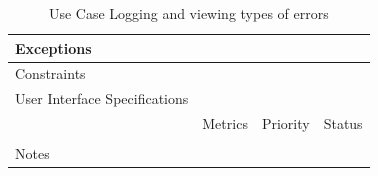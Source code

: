 \begin{table}[H]
\begin{tabularx}{\linewidth}{|l|X|X|X|}
            \hline Exceptions                    & \multicolumn{3}{l|}{}                                                                                 \\

            \hline Constraints                   & \multicolumn{3}{l|}{}                                                                                 \\

            \hline User Interface Specifications & \multicolumn{3}{l|}{}                                                                                 \\

            \hline \multirow{2}{*}{}             & Metrics                                                                           & Priority & Status \\
            \cline{2-4}                          &                                                                                   &          &        \\
            \hline Notes                         & \multicolumn{3}{l|}{}                                                                                 \\
            \hline
      \end{tabularx}
      \caption{Use Case Logging and viewing types of errors}
      \label{tab:use_case_;ogging_and_viewing_types_of_errors}
\end{table}

